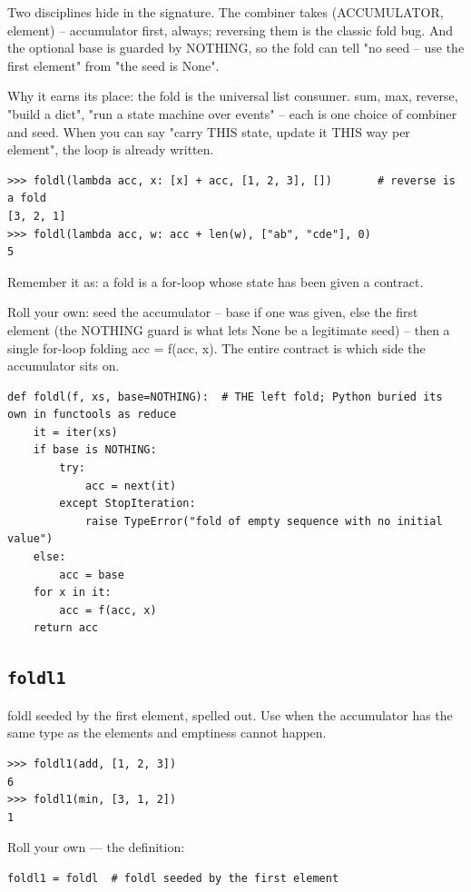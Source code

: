 \documentclass[10pt,letterpaper]{book}
\begin{document}
Two disciplines hide in the signature. The combiner takes (ACCUMULATOR, element) -- accumulator first, always; reversing them is the classic fold bug. And the optional base is guarded by NOTHING, so the fold can tell "no seed -- use the first element" from "the seed is None".


Why it earns its place: the fold is the universal list consumer. sum, max, reverse, "build a dict", "run a state machine over events" -- each is one choice of combiner and seed. When you can say "carry THIS state, update it THIS way per element", the loop is already written.

\begin{lstlisting}[style=ex]
>>> foldl(lambda acc, x: [x] + acc, [1, 2, 3], [])       # reverse is a fold
[3, 2, 1]
>>> foldl(lambda acc, w: acc + len(w), ["ab", "cde"], 0)
5
\end{lstlisting}

Remember it as: a fold is a for-loop whose state has been given a contract.


Roll your own: seed the accumulator -- base if one was given, else the first element (the NOTHING guard is what lets None be a legitimate seed) -- then a single for-loop folding acc = f(acc, x). The entire contract is which side the accumulator sits on.

\begin{lstlisting}[style=ex]
def foldl(f, xs, base=NOTHING):  # THE left fold; Python buried its own in functools as reduce
    it = iter(xs)
    if base is NOTHING:
        try:
            acc = next(it)
        except StopIteration:
            raise TypeError("fold of empty sequence with no initial value")
    else:
        acc = base
    for x in it:
        acc = f(acc, x)
    return acc
\end{lstlisting}
\subsection{\texttt{foldl1}}\label{def:foldl1}
foldl seeded by the first element, spelled out. Use when the accumulator has the same type as the elements and emptiness cannot happen.
\begin{lstlisting}[style=ex]
>>> foldl1(add, [1, 2, 3])
6
>>> foldl1(min, [3, 1, 2])
1
\end{lstlisting}

Roll your own --- the definition:

\begin{lstlisting}[style=ex]
foldl1 = foldl  # foldl seeded by the first element
\end{lstlisting}
\end{document}
